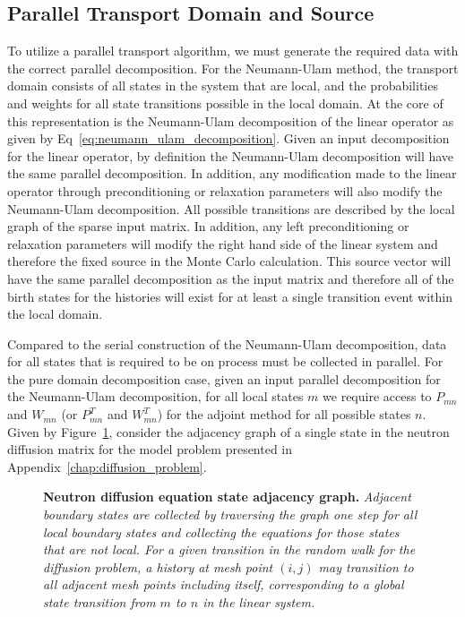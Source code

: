 \subsection{Parallel Transport Domain and Source }
\label{subsec:domain_generation}
To utilize a parallel transport algorithm, we must generate the
required data with the correct parallel decomposition. For the
Neumann-Ulam method, the transport domain consists of all states in
the system that are local, and the probabilities and weights for all
state transitions possible in the local domain. At the core of this
representation is the Neumann-Ulam decomposition of the linear
operator as given by Eq~\ref{eq:neumann_ulam_decomposition}. Given an
input decomposition for the linear operator, by definition the
Neumann-Ulam decomposition will have the same parallel
decomposition. In addition, any modification made to the linear
operator through preconditioning or relaxation parameters will also
modify the Neumann-Ulam decomposition. All possible transitions are
described by the local graph of the sparse input matrix. In addition,
any left preconditioning or relaxation parameters will modify the
right hand side of the linear system and therefore the fixed source in
the Monte Carlo calculation. This source vector will have the same
parallel decomposition as the input matrix and therefore all of the
birth states for the histories will exist for at least a single
transition event within the local domain.

Compared to the serial construction of the Neumann-Ulam decomposition,
data for all states that is required to be on process must be
collected in parallel. For the pure domain decomposition case, given
an input parallel decomposition for the Neumann-Ulam decomposition,
for all local states $m$ we require access to $P_{mn}$ and $W_{mn}$
(or $P^T_{mn}$ and $W^T_{mn}$) for the adjoint method for all possible
states $n$. Given by Figure~\ref{fig:diffusion_graph}, consider the
adjacency graph of a single state in the neutron diffusion matrix for
the model problem presented in Appendix~\ref{chap:diffusion_problem}.
\begin{figure}[t!]
  \begin{center}
    \scalebox{1.5}{  }
  \end{center}
  \caption{\textbf{Neutron diffusion equation state adjacency graph.}
    \textit{Adjacent boundary states are collected by traversing the
      graph one step for all local boundary states and collecting the
      equations for those states that are not local. For a given
      transition in the random walk for the diffusion problem, a
      history at mesh point $(i,j)$ may transition to all adjacent
      mesh points including itself, corresponding to a global state
      transition from $m$ to $n$ in the linear system.}}
  \label{fig:diffusion_graph}
\end{figure}

